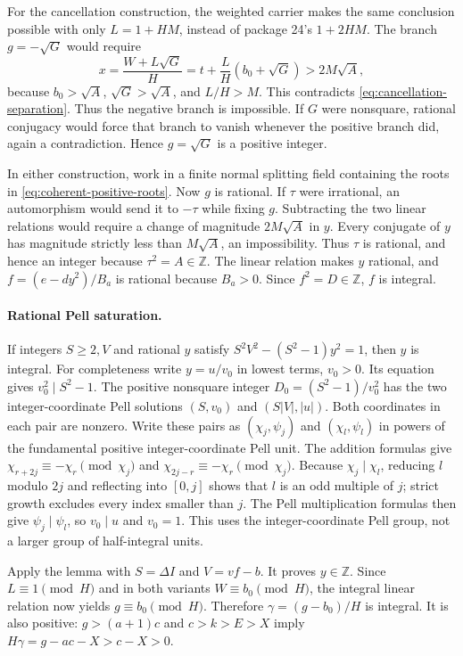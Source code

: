 For the cancellation construction, the weighted carrier makes the same
conclusion possible with only $L=1+HM$, instead of package 24's
$1+2HM$.  The branch $g=-\sqrt G$ would require
\[
 x=\frac{W+L\sqrt G}{H}
   =t+\frac LH(b_0+\sqrt G)>2M\sqrt A,
\]
because $b_0>\sqrt A$, $\sqrt G>\sqrt A$, and $L/H>M$.
This contradicts \eqref{eq:cancellation-separation}.  Thus the negative
branch is impossible.  If $G$ were nonsquare, rational conjugacy would
force that branch to vanish whenever the positive branch did, again a
contradiction.  Hence $g=\sqrt G$ is a positive integer.

In either construction, work in a finite normal splitting field containing
the roots in \eqref{eq:coherent-positive-roots}.  Now $g$ is rational.
If $\tau$ were irrational, an automorphism would send it to $-\tau$ while
fixing $g$.  Subtracting the two linear relations would require a change
of magnitude $2M\sqrt A$ in $y$.  Every conjugate of $y$ has magnitude
strictly less than $M\sqrt A$, an impossibility.  Thus $\tau$ is rational,
and hence an integer because $\tau^2=A\in\mathbb Z$.
The linear relation makes $y$ rational, and
$f=(e-dy^2)/B_a$ is rational because $B_a>0$.
Since $f^2=D\in\mathbb Z$, $f$ is integral.

\paragraph{Rational Pell saturation.}
If integers $S\ge2,V$ and rational $y$ satisfy
$S^2V^2-(S^2-1)y^2=1$, then $y$ is integral.
For completeness write $y=u/v_0$ in lowest terms, $v_0>0$.
Its equation gives $v_0^2\mid S^2-1$.
The positive nonsquare integer $D_0=(S^2-1)/v_0^2$ has the two
integer-coordinate Pell solutions $(S,v_0)$ and $(S|V|,|u|)$.
Both coordinates in each pair are nonzero.  Write these pairs as
$(\chi_j,\psi_j)$ and $(\chi_l,\psi_l)$ in powers of the fundamental
positive integer-coordinate Pell unit.  The addition formulas give
$\chi_{r+2j}\equiv-\chi_r\pmod{\chi_j}$ and
$\chi_{2j-r}\equiv-\chi_r\pmod{\chi_j}$.
Because $\chi_j\mid\chi_l$, reducing $l$ modulo $2j$ and reflecting
into $[0,j]$ shows that $l$ is an odd multiple of $j$; strict growth
excludes every index smaller than $j$.  The Pell multiplication formulas
then give $\psi_j\mid\psi_l$, so $v_0\mid u$ and $v_0=1$.
This uses the integer-coordinate Pell group, not a larger group of
half-integral units.

Apply the lemma with $S=\Delta I$ and $V=vf-b$.  It proves $y\in\mathbb Z$.
Since $L\equiv1\pmod H$ and in both variants $W\equiv b_0\pmod H$,
the integral linear relation now yields $g\equiv b_0\pmod H$.
Therefore $\gamma=(g-b_0)/H$ is integral.  It is also positive:
$g>(a+1)c$ and $c>k>E>X$ imply
$H\gamma=g-ac-X>c-X>0$.

